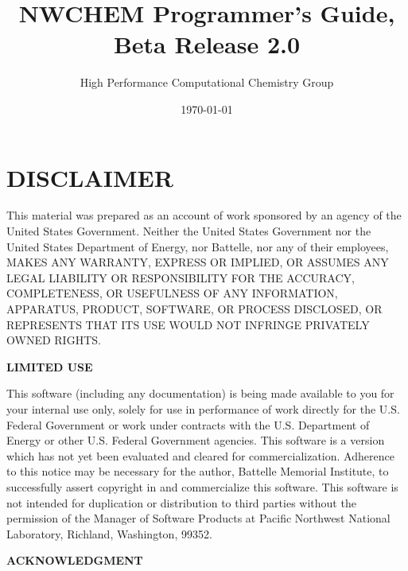 \setlength{\parskip}{6pt}

\newcommand{\TRUE}{\verb+.true.+}
\newcommand{\FALSE}{\verb+.false.+}



\title{\bf\Large NWCHEM Programmer's Guide, Beta Release 2.0}
\author{High Performance Computational Chemistry Group}
\date{\today}
\maketitle

\section*{\center DISCLAIMER}

This material was prepared as an account of work sponsored by an agency of the
United States Government.  Neither the United States Government nor the United
States Department of Energy, nor Battelle, nor any of their employees, MAKES
ANY WARRANTY, EXPRESS OR IMPLIED, OR ASSUMES ANY LEGAL LIABILITY OR
RESPONSIBILITY FOR THE ACCURACY, COMPLETENESS, OR USEFULNESS OF ANY
INFORMATION, APPARATUS, PRODUCT, SOFTWARE, OR PROCESS DISCLOSED, OR REPRESENTS
THAT ITS USE WOULD NOT INFRINGE PRIVATELY OWNED RIGHTS.


\begin{center}
{\bf LIMITED USE}
\end{center}

This software (including any documentation) is being made available to
you for your internal use only, solely for use in performance of work
directly for the U.S. Federal Government or work under contracts with
the U.S. Department of Energy or other U.S. Federal Government
agencies.  This software is a version which has not yet been evaluated
and cleared for commercialization.  Adherence to this notice may be
necessary for the author, Battelle Memorial Institute, to successfully
assert copyright in and commercialize this software.  This software is
not intended for duplication or distribution to third parties without
the permission of the Manager of Software Products at Pacific
Northwest National Laboratory, Richland, Washington, 99352.

\begin{center}
{\bf ACKNOWLEDGMENT}
\end{center}

